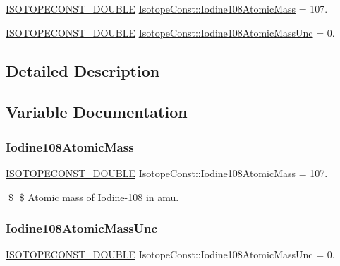 \begin{DoxyCompactItemize}
\item 
\mbox{\hyperlink{group___isotope_const-_macros_ga8f45a7272ce02c0b4c65c44636ed719a}{I\+S\+O\+T\+O\+P\+E\+C\+O\+N\+S\+T\+\_\+\+D\+O\+U\+B\+LE}} \mbox{\hyperlink{group___isotope_const-_iodine-_i108_ga594eeac99dda68ac1fcfec2f3bafa837}{Isotope\+Const\+::\+Iodine108\+Atomic\+Mass}} = 107.
\item 
\mbox{\hyperlink{group___isotope_const-_macros_ga8f45a7272ce02c0b4c65c44636ed719a}{I\+S\+O\+T\+O\+P\+E\+C\+O\+N\+S\+T\+\_\+\+D\+O\+U\+B\+LE}} \mbox{\hyperlink{group___isotope_const-_iodine-_i108_ga98f83cf1ba0ae03900154dd765edaa1e}{Isotope\+Const\+::\+Iodine108\+Atomic\+Mass\+Unc}} = 0.
\end{DoxyCompactItemize}


\subsection{Detailed Description}


\subsection{Variable Documentation}
\mbox{\label{group___isotope_const-_iodine-_i108_ga594eeac99dda68ac1fcfec2f3bafa837}} 
\subsubsection{\texorpdfstring{Iodine108\+Atomic\+Mass}{Iodine108AtomicMass}}
{\footnotesize\ttfamily \mbox{\hyperlink{group___isotope_const-_macros_ga8f45a7272ce02c0b4c65c44636ed719a}{I\+S\+O\+T\+O\+P\+E\+C\+O\+N\+S\+T\+\_\+\+D\+O\+U\+B\+LE}} Isotope\+Const\+::\+Iodine108\+Atomic\+Mass = 107.}

\$ \$ Atomic mass of Iodine-\/108 in amu. \mbox{\label{group___isotope_const-_iodine-_i108_ga98f83cf1ba0ae03900154dd765edaa1e}} 
\subsubsection{\texorpdfstring{Iodine108\+Atomic\+Mass\+Unc}{Iodine108AtomicMassUnc}}
{\footnotesize\ttfamily \mbox{\hyperlink{group___isotope_const-_macros_ga8f45a7272ce02c0b4c65c44636ed719a}{I\+S\+O\+T\+O\+P\+E\+C\+O\+N\+S\+T\+\_\+\+D\+O\+U\+B\+LE}} Isotope\+Const\+::\+Iodine108\+Atomic\+Mass\+Unc = 0.}

